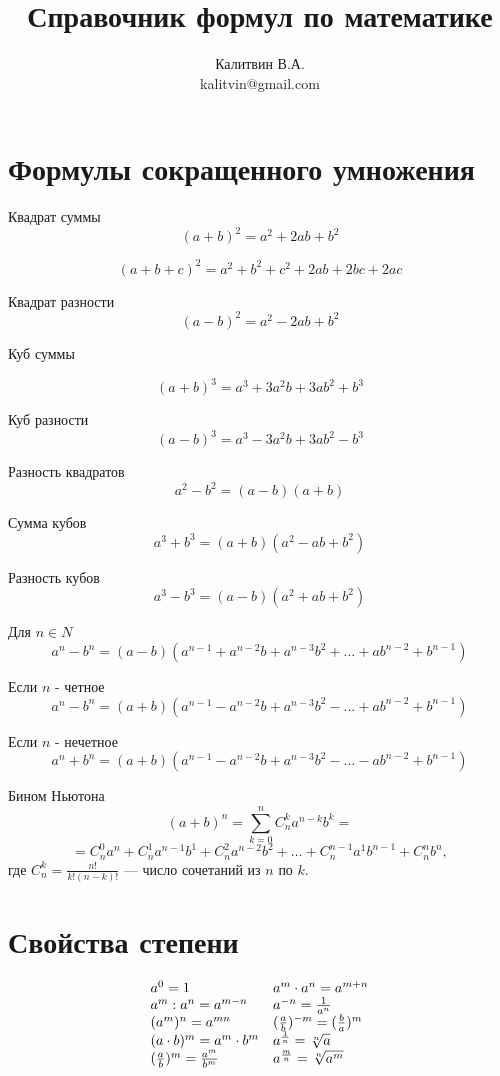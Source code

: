 \documentclass[a4paper, 12pt]{article}
\begin{document}
\author{Калитвин В.А.\\
kalitvin@gmail.com}
\title{Справочник формул по математике}
\maketitle
\thispagestyle{empty}
\newpage
\section{Формулы сокращенного умножения}

Квадрат суммы
$$ (a+b)^2=a^2+2ab+b^2$$

$$ (a+b+c)^2=a^2+b^2+c^2+2ab+2bc+2ac$$

Квадрат разности
$$(a-b)^2=a^2-2ab+b^2$$

Куб суммы

$$(a+b)^3=a^3+3a^2b+3ab^2+b^3$$

Куб разности
$$(a-b)^3=a^3-3a^2b+3ab^2-b^3$$

Разность квадратов
$$a^2-b^2=(a-b)(a+b)$$

Сумма кубов
$$a^3+b^3=(a+b)(a^2-ab+b^2)$$

Разность кубов
$$a^3-b^3=(a-b)(a^2+ab+b^2)$$

Для $n\in N$
$$a^n-b^n=(a-b)(a^{n-1}+a^{n-2}b+a^{n-3}b^2+\dots +ab^{n-2}+b^{n-1})$$

Если $n$ - четное
$$a^n-b^n=(a+b)(a^{n-1}-a^{n-2}b+a^{n-3}b^2-\dots +ab^{n-2}+b^{n-1})$$

Если $n$ - нечетное
$$a^n+b^n=(a+b)(a^{n-1}-a^{n-2}b+a^{n-3}b^2-\dots -ab^{n-2}+b^{n-1})$$

Бином Ньютона
$$(a+b)^n=\sum\limits_{k=0}^n C_n^ka^{n-k}b^k=$$
$$=C_n^0a^n+C_n^1a^{n-1}b^1+C_n^2a^{n-2}b^2+\dots +C_n^{n-1}a^1b^{n-1}+C_n^nb^n,$$
где $C_n^k=\frac{n!}{k!(n-k)!}$ --- число сочетаний из $n$ по $k.$

\section{Свойства степени}

$$
\begin{array}{ll}
a^0=1  & a^m\cdot a^n=a^{m+n}\\
a^m: a^n=a^{m-n} & a^{-n}=\frac{1}{a^n}\\
(a^m)^n=a^{mn} & (\frac{a}{b})^{-m}=(\frac{b}{a})^{m}\\
(a\cdot b)^m=a^m\cdot b^m & a^{\frac{1}{n}}=\root{n}\of{a}\\
(\frac{a}{b})^m =\frac{a^m}{b^m} & a^{\frac{m}{n}}=\root{n}\of{a^m}\\
\end{array}
$$
\end{document}
